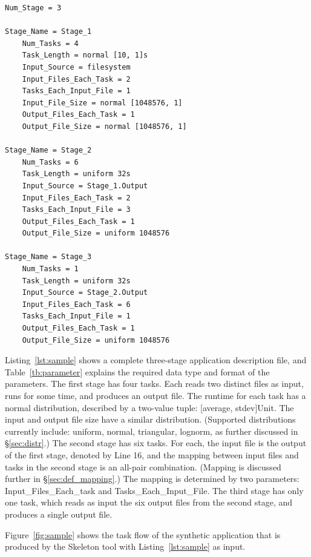 \documentclass{sig-alternate}
\begin{document}
\begin{lstlisting}[caption=Sample input for a three-stage application, label=lst:sample, linewidth=1.0\textwidth, xleftmargin=2.5ex, basicstyle=\ttfamily\scriptsize]
Num_Stage = 3

Stage_Name = Stage_1
    Num_Tasks = 4  
    Task_Length = normal [10, 1]s
    Input_Source = filesystem
    Input_Files_Each_Task = 2
    Tasks_Each_Input_File = 1
    Input_File_Size = normal [1048576, 1]    
    Output_Files_Each_Task = 1
    Output_File_Size = normal [1048576, 1]

Stage_Name = Stage_2
    Num_Tasks = 6
    Task_Length = uniform 32s
    Input_Source = Stage_1.Output
    Input_Files_Each_Task = 2
    Tasks_Each_Input_File = 3
    Output_Files_Each_Task = 1
    Output_File_Size = uniform 1048576

Stage_Name = Stage_3
    Num_Tasks = 1
    Task_Length = uniform 32s
    Input_Source = Stage_2.Output
    Input_Files_Each_Task = 6
    Tasks_Each_Input_File = 1
    Output_Files_Each_Task = 1
    Output_File_Size = uniform 1048576
\end{lstlisting}


Listing~\ref{lst:sample} shows a complete three-stage application description file, and Table~\ref{tb:parameter} explains the required data type and format of the parameters. The first stage has four tasks. Each reads two distinct files as input, runs for some time, and produces an output
file. The runtime for each task has a normal distribution, described by a two-value tuple: [average, stdev]Unit. The input and output file size have a similar distribution. (Supported distributions
currently include: uniform, normal, triangular, lognorm, as further discussed in \S\ref{sec:distr}.) The second stage has six tasks. For each, the input file is the output of the first stage, denoted by Line 16, and the mapping between input 
files and tasks in the second stage is an all-pair combination. (Mapping is discussed further in \S\ref{sec:def_mapping}.) The mapping is determined by two parameters: Input\_Files\_Each\_task and Tasks\_Each\_Input\_File. The third stage has only one task, which
reads as  input  the six output files from the second stage, and produces a single output file.


Figure~\ref{fig:sample} shows the task flow of the synthetic application that is produced by the Skeleton tool with Listing~\ref{lst:sample} as input.
\end{document}
